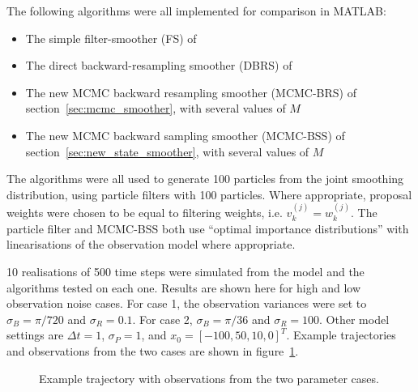 \documentclass[journal]{IEEEtran}
\begin{document}
The following algorithms were all implemented for comparison in MATLAB:

\begin{itemize}
	\item The simple filter-smoother (FS) of \cite{Kitagawa1996}
	\item The direct backward-resampling smoother (DBRS) of \cite{Godsill2004}
	\item The new MCMC backward resampling smoother (MCMC-BRS) of section~\ref{sec:mcmc_smoother}, with several values of $M$
	\item The new MCMC backward sampling smoother (MCMC-BSS) of section~\ref{sec:new_state_smoother}, with several values of $M$
\end{itemize}

The algorithms were all used to generate 100 particles from the joint smoothing distribution, using particle filters with 100 particles. Where appropriate, proposal weights were chosen to be equal to filtering weights, i.e. $v_k^{(j)} = w_k^{(j)}$. The particle filter and MCMC-BSS both use ``optimal importance distributions'' with linearisations of the observation model where appropriate.

10 realisations of 500 time steps were simulated from the model and the algorithms tested on each one. Results are shown here for high and low observation noise cases. For case 1, the observation variances were set to $\sigma_B = \pi/720$ and $\sigma_R = 0.1$. For case 2, $\sigma_B = \pi/36$ and $\sigma_R = 100$. Other model settings are $\Delta t = 1$, $\sigma_P = 1$, and $x_0 = [-100, 50, 10, 0]^T$. Example trajectories and observations from the two cases are shown in figure~\ref{fig:example_trajectories}.

\begin{figure}[!t]
\centerline{
\hfil
{}}
\caption{Example trajectory with observations from the two parameter cases.}
\label{fig:example_trajectories}
\end{figure}
\end{document}
